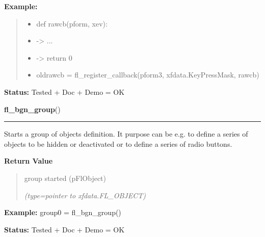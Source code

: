 \begin{boxedminipage}{\funcwidth}
\textbf{Example:}
\begin{quote}
  \begin{itemize}

  \item
    \setlength{\parskip}{0.6ex}
def rawcb(pform, xev):



  \item {\textbar}-{\textgreater}{\textbar} ...



  \item {\textbar}-{\textgreater}{\textbar} return 0



  \item oldrawcb = fl\_register\_callback(pform3, xfdata.KeyPressMask, rawcb)



\end{itemize}

\end{quote}

\textbf{Status:} Tested + Doc + Demo = OK



    \end{boxedminipage}

    \label{xformslib:flbasic:fl_bgn_group}

    \vspace{0.5ex}

\hspace{.8\funcindent}\begin{boxedminipage}{\funcwidth}

    \raggedright \textbf{fl\_bgn\_group}()

    \vspace{-1.5ex}

    \rule{\textwidth}{0.5\fboxrule}
\setlength{\parskip}{2ex}
    Starts a group of objects definition. It purpose can be e.g. to define 
    a series of objects to be hidden or deactivated or to define a series 
    of radio buttons.

\setlength{\parskip}{1ex}
      \textbf{Return Value}
    \vspace{-1ex}

      \begin{quote}
      group started (pFlObject)

      {\it (type=pointer to xfdata.FL\_OBJECT)}

      \end{quote}

\textbf{Example:} group0 = fl\_bgn\_group()



\textbf{Status:} Tested + Doc + Demo = OK



    \end{boxedminipage}

